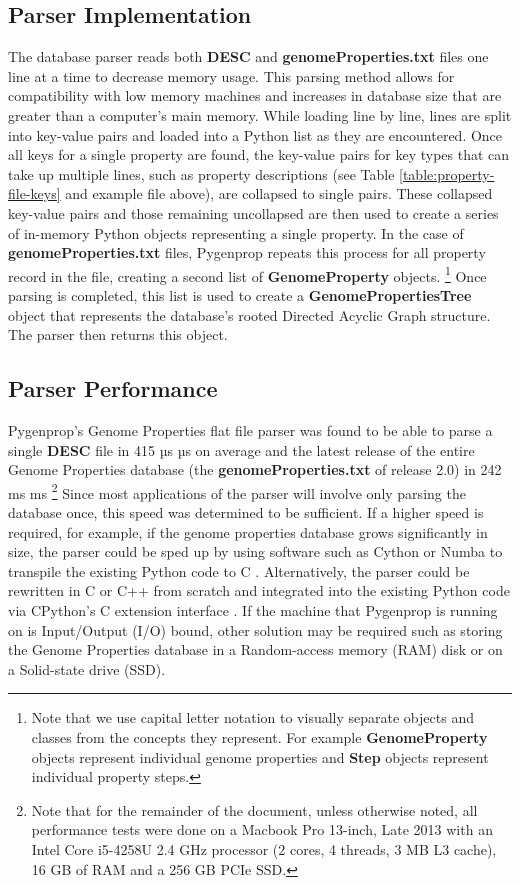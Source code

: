 \subsection{Parser Implementation}

The database parser reads both \textbf{DESC} and \textbf{genomeProperties.txt} files one line at a time to decrease memory usage. This parsing method allows for compatibility with low memory machines and increases in database size that are greater than a computer's main memory. While loading line by line, lines are split into key-value pairs and loaded into a Python list as they are encountered. Once all keys for a single property are found, the key-value pairs for key types that can take up multiple lines, such as property descriptions (see Table \ref{table:property-file-keys} and example file above), are collapsed to single pairs. These collapsed key-value pairs and those remaining uncollapsed are then used to create a series of in-memory Python objects representing a single property. In the case of \textbf{genomeProperties.txt} files, Pygenprop repeats this process for all property record in the file, creating a second list of \textbf{GenomeProperty} objects. \footnote{Note that we use capital letter notation to visually separate objects and classes from the concepts they represent. For example \textbf{GenomeProperty} objects represent individual genome properties and \textbf{Step} objects represent individual property steps.} Once parsing is completed, this list is used to create a \textbf{GenomePropertiesTree} object that represents the database's rooted Directed Acyclic Graph structure. The parser then returns this object.

\subsection{Parser Performance}

Pygenprop's Genome Properties flat file parser was found to be able to parse a single \textbf{DESC} file in 415 µs  µs on average and the latest release of the entire Genome Properties database (the \textbf{genomeProperties.txt} of release 2.0) in 242 ms  ms \footnote{Note that for the remainder of the document, unless otherwise noted, all performance tests were done on a Macbook Pro 13-inch, Late 2013 with an Intel Core i5-4258U 2.4 GHz processor (2 cores, 4 threads, 3 MB L3 cache), 16 GB of RAM and a 256 GB PCIe SSD.} Since most applications of the parser will involve only parsing the database once, this speed was determined to be sufficient. If a higher speed is required, for example, if the genome properties database grows significantly in size, the parser could be sped up by using software such as Cython \cite{behnel2010cython} or Numba \cite{lam2015numba} to transpile the existing Python code to C \cite{kernighan2006c}. Alternatively, the parser could be rewritten in C or C++ \cite{ISO:1998:IIP} from scratch and integrated into the existing Python code via CPython's C extension interface \cite{van1995python}. If the machine that Pygenprop is running on is Input/Output (I/O) bound, other solution may be required such as storing the Genome Properties database in a Random-access memory (RAM) disk or on a Solid-state drive (SSD).

